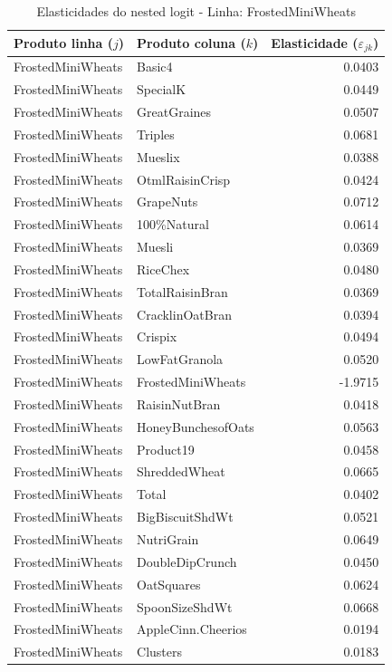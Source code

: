 \begingroup
\begin{table}[H]
\centering
\caption{Elasticidades do nested logit - Linha: FrostedMiniWheats}
\label{tab:elas-nested-frostedminiwheats}
\small
\begin{tabular}{llr}
\toprule
Produto linha ($j$) & Produto coluna ($k$) & Elasticidade ($\varepsilon_{jk}$) \\
\midrule
FrostedMiniWheats & Basic4 & 0.0403 \\
FrostedMiniWheats & SpecialK & 0.0449 \\
FrostedMiniWheats & GreatGraines & 0.0507 \\
FrostedMiniWheats & Triples & 0.0681 \\
FrostedMiniWheats & Mueslix & 0.0388 \\
FrostedMiniWheats & OtmlRaisinCrisp & 0.0424 \\
FrostedMiniWheats & GrapeNuts & 0.0712 \\
FrostedMiniWheats & 100\%Natural & 0.0614 \\
FrostedMiniWheats & Muesli & 0.0369 \\
FrostedMiniWheats & RiceChex & 0.0480 \\
FrostedMiniWheats & TotalRaisinBran & 0.0369 \\
FrostedMiniWheats & CracklinOatBran & 0.0394 \\
FrostedMiniWheats & Crispix & 0.0494 \\
FrostedMiniWheats & LowFatGranola & 0.0520 \\
FrostedMiniWheats & FrostedMiniWheats & -1.9715 \\
FrostedMiniWheats & RaisinNutBran & 0.0418 \\
FrostedMiniWheats & HoneyBunchesofOats & 0.0563 \\
FrostedMiniWheats & Product19 & 0.0458 \\
FrostedMiniWheats & ShreddedWheat & 0.0665 \\
FrostedMiniWheats & Total & 0.0402 \\
FrostedMiniWheats & BigBiscuitShdWt & 0.0521 \\
FrostedMiniWheats & NutriGrain & 0.0649 \\
FrostedMiniWheats & DoubleDipCrunch & 0.0450 \\
FrostedMiniWheats & OatSquares & 0.0624 \\
FrostedMiniWheats & SpoonSizeShdWt & 0.0668 \\
FrostedMiniWheats & AppleCinn.Cheerios & 0.0194 \\
FrostedMiniWheats & Clusters & 0.0183 \\

\end{tabular}
\end{table}
